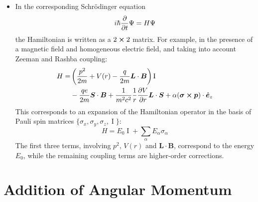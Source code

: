 \documentclass[11pt, a4paper]{article}
\newcommand{\Schro}{Schr\"{o}dinger\xspace}
\newcommand{\Ham}{Hamiltonian\xspace}
\renewcommand{\vec}[1]{\bm{#1}}  %
\newcommand{\uvec}[1]{\hat{\vec{#1}}}  %
\renewcommand{\L}{\vec{L}}  %
\renewcommand{\S}{\vec{S}}  %
\newcommand{\B}{\vec{B}}  %
\newcommand{\II}{\operatorname{I}}  %
\renewcommand{\P}{\Psi}  %
\begin{document}
\begin{itemize}
	\item In the corresponding \Schro equation
	\begin{equation*}
		i \hbar \pdv{t} \P = H \P
	\end{equation*}
	the \Ham is written as a $ 2 \cross 2 $ matrix. For example, in the presence of a magnetic field and homogeneous electric field, and taking into account Zeeman and Rashba coupling:
	\begin{align*}
		H = &\left(\frac{p^{2}}{2m} + V(r) - \frac{q}{2m}\L \cdot \B\right)\II\\
		& - \frac{qe}{2m}\S \cdot \B + \frac{1}{m^{2}c^{2}}\frac{1}{r}\pdv{V}{r} \L \cdot \S + \alpha (\vec{\sigma}\cross \vec{p})\cdot \uvec{e}_{z}
	\end{align*}
	This corresponds to an expansion of the \Ham operator in the basis of Pauli spin matrices $ \{\sigma_{x}, \sigma_{y}, \sigma_{z}, \II\} $:
	\begin{equation*}
		H = E_{0}\II + \sum_{\alpha}E_{\alpha}\sigma_{\alpha}
	\end{equation*}
	The first three terms, involving $ p^{2} $, $ V(r) $ and $ \L \cdot \B $, correspond to the energy $ E_{0} $, while the remaining coupling terms are higher-order corrections.
	
\end{itemize}


\section{Addition of Angular Momentum}
\end{document}
